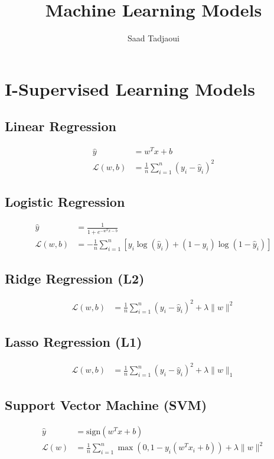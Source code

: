 \documentclass[a4paper,10pt]{article}
\title{\textbf{Machine Learning Models}}
\author{Saad Tadjaoui}
\date{}
\begin{document}
\maketitle

\section*{I-Supervised Learning Models}

\subsection*{Linear Regression}
\begin{align*}
\hat{y} &= w^T x + b \\
\mathcal{L}(w, b) &= \frac{1}{n} \sum_{i=1}^n (y_i - \hat{y}_i)^2
\end{align*}

\subsection*{Logistic Regression}
\begin{align*}
\hat{y} &= \frac{1}{1 + e^{-w^T x - b}} \\
\mathcal{L}(w, b) &= - \frac{1}{n} \sum_{i=1}^n \left[ y_i \log(\hat{y}_i) + (1 - y_i) \log(1 - \hat{y}_i) \right]
\end{align*}

\subsection*{Ridge Regression (L2)}
\begin{align*}
\mathcal{L}(w, b) &= \frac{1}{n} \sum_{i=1}^n (y_i - \hat{y}_i)^2 + \lambda \|w\|^2
\end{align*}

\subsection*{Lasso Regression (L1)}
\begin{align*}
\mathcal{L}(w, b) &= \frac{1}{n} \sum_{i=1}^n (y_i - \hat{y}_i)^2 + \lambda \|w\|_1
\end{align*}

\subsection*{Support Vector Machine (SVM)}
\begin{align*}
\hat{y} &= \text{sign}(w^T x + b) \\
\mathcal{L}(w) &= \frac{1}{n} \sum_{i=1}^n \max(0, 1 - y_i(w^T x_i + b)) + \lambda \|w\|^2
\end{align*}
\end{document}
